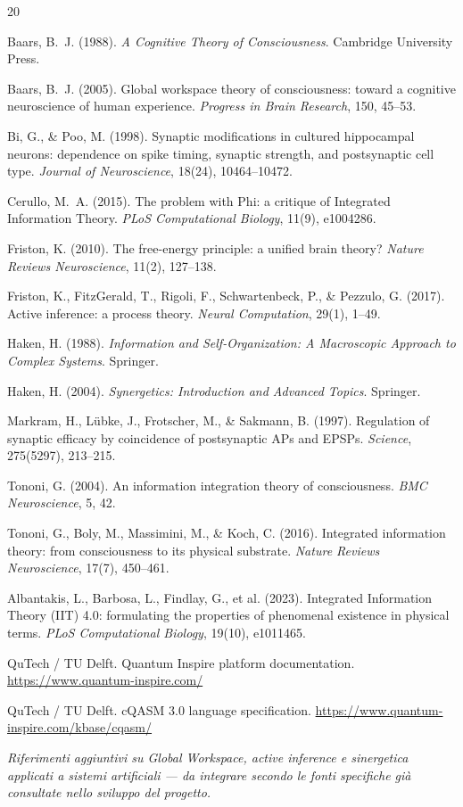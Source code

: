 \documentclass[11pt,a4paper]{article}
\begin{document}
\begin{thebibliography}{20}

 Baars, B.~J. (1988). \emph{A Cognitive Theory of Consciousness}. Cambridge University Press.

 Baars, B.~J. (2005). Global workspace theory of consciousness: toward a cognitive neuroscience of human experience. \emph{Progress in Brain Research}, 150, 45--53.

 Bi, G., \& Poo, M. (1998). Synaptic modifications in cultured hippocampal neurons: dependence on spike timing, synaptic strength, and postsynaptic cell type. \emph{Journal of Neuroscience}, 18(24), 10464--10472.

 Cerullo, M.~A. (2015). The problem with Phi: a critique of Integrated Information Theory. \emph{PLoS Computational Biology}, 11(9), e1004286.

 Friston, K. (2010). The free-energy principle: a unified brain theory? \emph{Nature Reviews Neuroscience}, 11(2), 127--138.

 Friston, K., FitzGerald, T., Rigoli, F., Schwartenbeck, P., \& Pezzulo, G. (2017). Active inference: a process theory. \emph{Neural Computation}, 29(1), 1--49.

 Haken, H. (1988). \emph{Information and Self-Organization: A Macroscopic Approach to Complex Systems}. Springer.

 Haken, H. (2004). \emph{Synergetics: Introduction and Advanced Topics}. Springer.

 Markram, H., L\"ubke, J., Frotscher, M., \& Sakmann, B. (1997). Regulation of synaptic efficacy by coincidence of postsynaptic APs and EPSPs. \emph{Science}, 275(5297), 213--215.

 Tononi, G. (2004). An information integration theory of consciousness. \emph{BMC Neuroscience}, 5, 42.

 Tononi, G., Boly, M., Massimini, M., \& Koch, C. (2016). Integrated information theory: from consciousness to its physical substrate. \emph{Nature Reviews Neuroscience}, 17(7), 450--461.

 Albantakis, L., Barbosa, L., Findlay, G., et al. (2023). Integrated Information Theory (IIT) 4.0: formulating the properties of phenomenal existence in physical terms. \emph{PLoS Computational Biology}, 19(10), e1011465.

 QuTech / TU Delft. Quantum Inspire platform documentation. \url{https://www.quantum-inspire.com/}

 QuTech / TU Delft. cQASM 3.0 language specification. \url{https://www.quantum-inspire.com/kbase/cqasm/}

\end{thebibliography}

\medskip
\noindent\emph{Riferimenti aggiuntivi su Global Workspace, active inference e sinergetica applicati a sistemi artificiali --- da integrare secondo le fonti specifiche gi\`a consultate nello sviluppo del progetto.}
\end{document}
